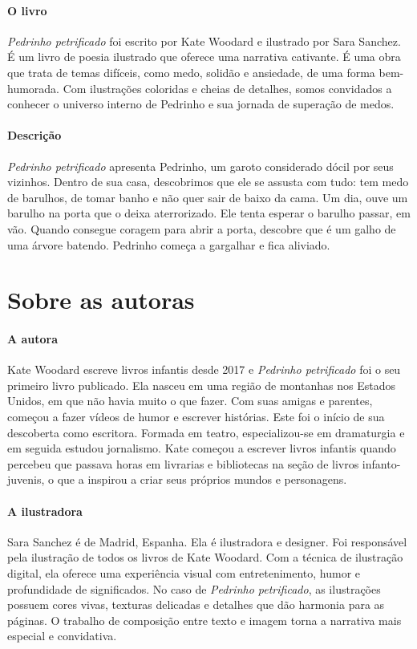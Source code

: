 \documentclass[11pt]{extarticle}
\begin{document}
\paragraph{O livro} \textit{Pedrinho petrificado} foi escrito por Kate Woodard e ilustrado por Sara Sanchez. É um livro de poesia ilustrado que oferece uma narrativa cativante. É uma obra que trata de temas difíceis, como medo, solidão e ansiedade, de uma forma bem-humorada. Com ilustrações coloridas e cheias de detalhes, somos convidados a conhecer o universo interno de Pedrinho e sua jornada de superação de medos.

\paragraph{Descrição} \textit{Pedrinho petrificado} apresenta Pedrinho, um garoto considerado dócil por seus vizinhos. Dentro de sua casa, descobrimos que ele se assusta com tudo: tem medo de barulhos, de tomar banho e não quer sair de baixo da cama. Um dia, ouve um barulho na porta que o deixa aterrorizado. Ele tenta esperar o barulho passar, em vão. Quando consegue coragem para abrir a porta, descobre que é um galho de uma árvore batendo. Pedrinho começa a gargalhar e fica aliviado.

\section{Sobre as autoras}


\paragraph{A autora} Kate Woodard escreve livros infantis desde 2017 e \textit{Pedrinho petrificado} foi o seu primeiro livro publicado. Ela nasceu em uma região de montanhas nos Estados Unidos, em que não havia muito o que fazer. Com suas amigas e parentes, começou a fazer vídeos de humor e escrever histórias. Este foi o início de sua descoberta como escritora. Formada em teatro, especializou-se em dramaturgia e em seguida estudou jornalismo. Kate começou a escrever livros infantis quando percebeu que passava horas em livrarias e bibliotecas na seção de livros infanto-juvenis, o que a inspirou a criar seus próprios mundos e personagens.

\paragraph{A ilustradora} Sara Sanchez é de Madrid, Espanha. Ela é ilustradora e designer. Foi responsável pela ilustração de todos os livros de Kate Woodard. Com a técnica de ilustração digital, ela oferece uma experiência visual com entretenimento, humor e profundidade de significados. No caso de \textit{Pedrinho petrificado}, as ilustrações possuem cores vivas, texturas delicadas e detalhes que dão harmonia para as páginas. O trabalho de composição entre texto e imagem torna a narrativa mais especial e convidativa.
\end{document}
